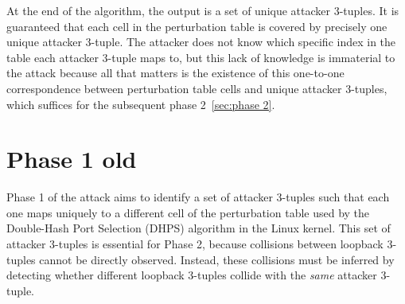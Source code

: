 \documentclass{report}
\begin{document}
At the end of the algorithm, the \alert{output} is a set of unique attacker 3-tuples. It is guaranteed that each cell in the perturbation table is covered by precisely one unique attacker 3-tuple. The attacker does not know which specific \alert{index} in the table each attacker 3-tuple maps to, but this lack of knowledge is immaterial to the attack because all that matters is the existence of this one-to-one correspondence between perturbation table cells and unique attacker 3-tuples, which suffices for the subsequent phase 2~\ref{sec:phase 2}.



\section{Phase 1 old}
\label{sec:phase 1 old}


Phase 1 of the attack aims to identify a set of attacker 3-tuples such that each one maps uniquely to a different cell of the perturbation table used by the Double-Hash Port Selection (DHPS) algorithm in the Linux kernel. This set of attacker 3-tuples is essential for Phase 2, because collisions between loopback 3-tuples cannot be directly observed. Instead, these collisions must be inferred by detecting whether different loopback 3-tuples collide with the \emph{same} attacker 3-tuple.
\end{document}
